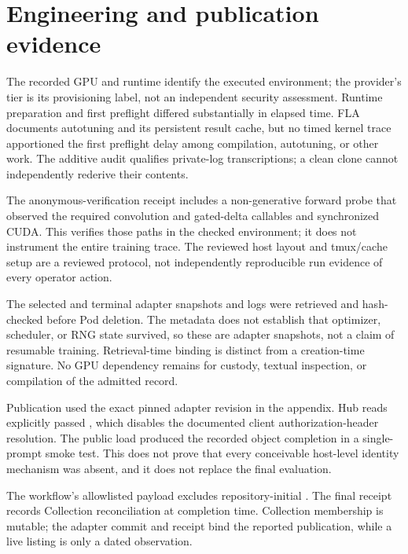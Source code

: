 \section{Engineering and publication evidence}
The recorded GPU and runtime identify the executed environment; the provider's
 tier is its provisioning label, not an independent security
assessment. Runtime preparation and first preflight differed substantially in
elapsed time. FLA documents autotuning and its persistent result cache, but no
timed kernel trace apportioned the first preflight delay among compilation,
autotuning, or other work. The additive audit qualifies private-log
transcriptions; a clean clone cannot independently rederive their contents.
\citep{flashlinearattention}

The anonymous-verification receipt includes a non-generative forward probe
that observed the required convolution and gated-delta callables and
synchronized CUDA. This verifies those paths in the checked environment; it
does not instrument the entire training trace. The reviewed host layout and
tmux/cache setup are a reviewed protocol, not independently reproducible run
evidence of every operator action.\citep{qwen38source}

The selected and terminal adapter snapshots and logs were retrieved and
hash-checked before Pod deletion. The metadata does not establish that
optimizer, scheduler, or RNG state survived, so these are adapter snapshots,
not a claim of resumable training. Retrieval-time binding is distinct from a
creation-time signature. No GPU dependency remains for custody, textual
inspection, or compilation of the admitted record.

Publication used the exact pinned adapter revision in the appendix. Hub reads
explicitly passed , which disables the documented client
authorization-header resolution. The public load produced the recorded object
completion in a single-prompt smoke test. This does not prove that every
conceivable host-level identity mechanism was absent, and it does not replace
the final evaluation.\citep{qwen38publisher,hubheaders,peftmodel}

The workflow's allowlisted payload excludes repository-initial
. The final receipt records Collection reconciliation at
completion time. Collection membership is mutable; the adapter commit and
receipt bind the reported publication, while a live listing is only a dated
observation.
